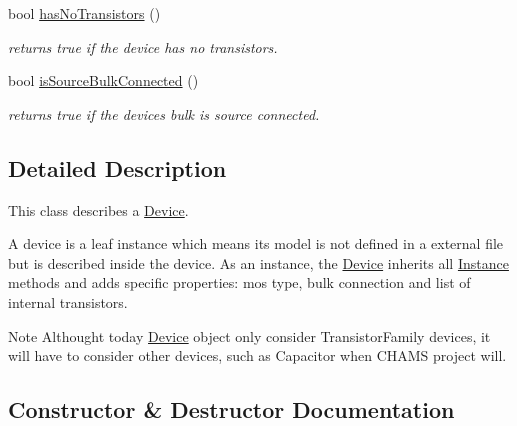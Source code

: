 \begin{DoxyCompactItemize}
bool \hyperlink{class_open_chams_1_1_device_aa9d93f306256ac57b8bb8a4cb436c8d3}{has\+No\+Transistors} ()
\begin{DoxyCompactList}\small\item\em returns true if the device has no transistors. \end{DoxyCompactList}\item 
\mbox{\label{class_open_chams_1_1_device_a29ed1982e1a8b3a634df8d0c70039669}} 
bool \hyperlink{class_open_chams_1_1_device_a29ed1982e1a8b3a634df8d0c70039669}{is\+Source\+Bulk\+Connected} ()
\begin{DoxyCompactList}\small\item\em returns true if the device\textquotesingle{}s bulk is source connected. \end{DoxyCompactList}\end{DoxyCompactItemize}


\subsection{Detailed Description}
This class describes a \hyperlink{class_open_chams_1_1_device}{Device}.

A device is a leaf instance which means its model is not defined in a external file but is described inside the device. As an instance, the \hyperlink{class_open_chams_1_1_device}{Device} inherits all \hyperlink{class_open_chams_1_1_instance}{Instance} methods and adds specific properties\+: mos type, bulk connection and list of internal transistors.

\begin{DoxyNote}{Note}
Althought today \hyperlink{class_open_chams_1_1_device}{Device} object only consider Transistor\+Family devices, it will have to consider other devices, such as Capacitor when C\+H\+A\+MS project will. 
\end{DoxyNote}


\subsection{Constructor \& Destructor Documentation}
\mbox{\label{class_open_chams_1_1_device_af5d1871d38a605955d7848d07df6d9a4}} 
